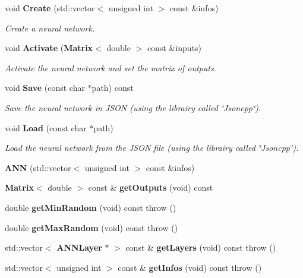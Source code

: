 \begin{DoxyCompactItemize}
\item 
void {\bf Create} (std\+::vector$<$ unsigned int $>$ const \&infos)
\begin{DoxyCompactList}\small\item\em Create a neural network. \end{DoxyCompactList}\item 
void {\bf Activate} ({\bf Matrix}$<$ double $>$ const \&inputs)
\begin{DoxyCompactList}\small\item\em Activate the neural network and set the matrix of outputs. \end{DoxyCompactList}\item 
void {\bf Save} (const char $\ast$path) const 
\begin{DoxyCompactList}\small\item\em Save the neural network in J\+S\+O\+N (using the librairy called \char`\"{}\+Jsoncpp\char`\"{}). \end{DoxyCompactList}\item 
void {\bf Load} (const char $\ast$path)
\begin{DoxyCompactList}\small\item\em Load the neural network from the J\+S\+O\+N file (using the librairy called \char`\"{}\+Jsoncpp\char`\"{}). \end{DoxyCompactList}\item 
{\bfseries A\+N\+N} (std\+::vector$<$ unsigned int $>$ const \&infos)\label{class_g_a_n_n_1_1_a_n_n_a8b7b98feba4aea412db698035cdcb418}

\item 
{\bf Matrix}$<$ double $>$ const \& {\bfseries get\+Outputs} (void) const \label{class_g_a_n_n_1_1_a_n_n_a0c24550b535019fc04027da71f3e8ebf}

\item 
double {\bfseries get\+Min\+Random} (void) const   throw ()\label{class_g_a_n_n_1_1_a_n_n_a732ada0242d9ac9a9a52c7f0c09ca26a}

\item 
double {\bfseries get\+Max\+Random} (void) const   throw ()\label{class_g_a_n_n_1_1_a_n_n_a3baaedfda1392d8eea5c9a814567626d}

\item 
std\+::vector$<$ {\bf A\+N\+N\+Layer} $\ast$ $>$ const \& {\bfseries get\+Layers} (void) const   throw ()\label{class_g_a_n_n_1_1_a_n_n_a7583e743d7a6d11a36d2b6541b125654}

\item 
std\+::vector$<$ unsigned int $>$ const \& {\bfseries get\+Infos} (void) const   throw ()\label{class_g_a_n_n_1_1_a_n_n_a7524d58a84e19f6dace9fd35a2faf224}


\end{DoxyCompactItemize}
